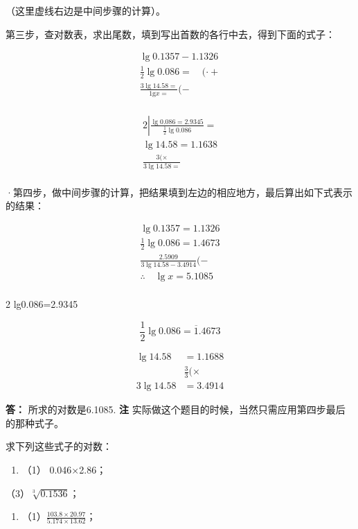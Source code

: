 （这里虚线右边是中间步骤的计算）。

第三步，查对数表，求出尾数，填到写出首数的各行中去，得到下面的式子：

\[
\begin{array}{l} \lg 0.1357 - 1.1326 \\ \frac{1}{2} \lg 0.086 = \quad (\cdot + \\ \frac{3 \lg 14.58 =}{1 \mathrm{g} x =} (- \\ \end{array}
\]

\[
\begin{array}{l} 2 \left| \frac{\lg 0.086 = 2.9345}{\frac{1}{2} \lg 0.086} = \right. \\ \lg 14.58 = 1.1638 \\ \frac{3 (\times}{3 \lg 14.58 =} \\ \end{array}
\]

·第四步，做中间步骤的计算，把结果填到左边的相应地方，最后算出如下式表示的结果：

\[
\begin{array}{l} \lg 0.1357 = 1.1326 \\ \frac{1}{2} \lg 0.086 = 1.4673 \\ \frac{2.5909}{3 \lg 14.58 - 3.4914} (- \\ \therefore \quad \lg x = 5.1085 \\ \end{array}
\]

2\textbar{} lg0.086=2.9345

\[
\frac{1}{2} \lg 0.086 = \overline {{1}}. 4673
\]

\[
\begin{array}{rl} \lg 14.58 & = 1.1688 \\ & \frac{3}{3} (\times \\ \hline 3 \lg 14.58 & = 3.4914 \end{array}
\]

\textbf{答：} 所求的对数是6.1085. \textbf{注}
实际做这个题目的时候，当然只需应用第四步最后的那种式子。

求下列这些式子的对数：

\begin{enumerate}
\item
  （1） 0.046×2.86；
\end{enumerate}

（3）\(\sqrt[3]{0.1536}\)；

\begin{enumerate}[start=2]
\item
  （1）\(\frac{103.8 \times 20.97}{5.174 \times 13.62}\)；
\end{enumerate}

